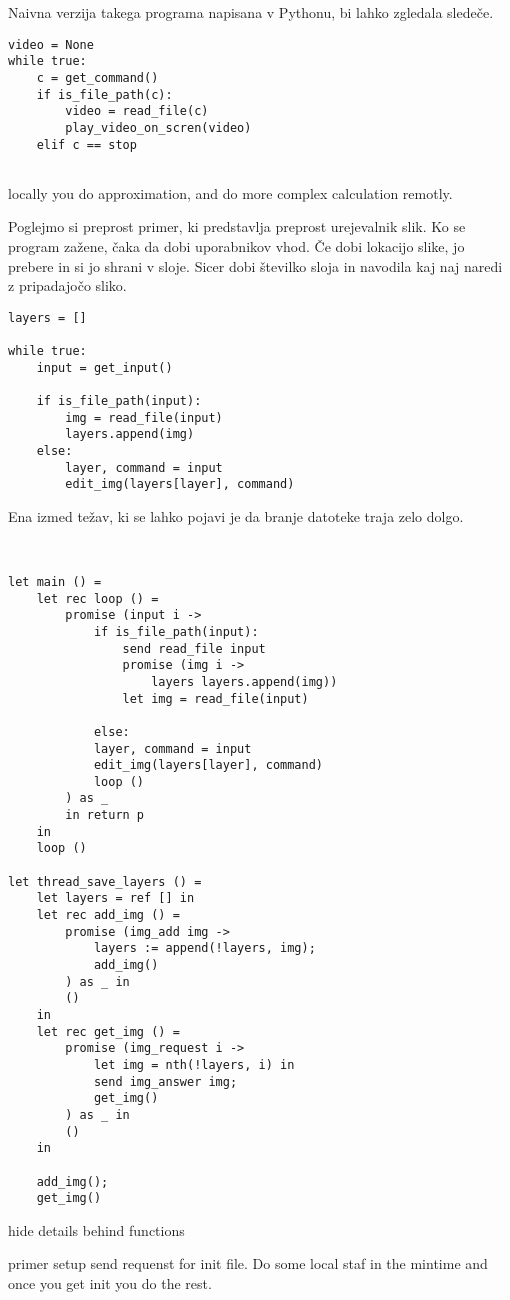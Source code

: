 Naivna verzija takega programa napisana v Pythonu, bi lahko zgledala sledeče.

\begin{lstlisting}[caption={Naiven program.},label={prog:predvajalnik-naiven}]
video = None
while true:
	c = get_command()
	if is_file_path(c):
		video = read_file(c)
		play_video_on_scren(video)
	elif c == stop
		
\end{lstlisting}


locally you do approximation, and do more complex calculation remotly.


Poglejmo si preprost primer, ki predstavlja preprost urejevalnik slik.
Ko se program zažene, čaka da dobi uporabnikov vhod.
Če dobi lokacijo slike, jo prebere in si jo shrani v sloje.
Sicer dobi številko sloja in navodila kaj naj naredi z pripadajočo sliko.

\begin{lstlisting}[caption={Sinhron program.},label={prog:editor-python}]
layers = []

while true:
	input = get_input()
	
	if is_file_path(input):
		img = read_file(input)
		layers.append(img)
	else:
		layer, command = input	
		edit_img(layers[layer], command)
\end{lstlisting}

Ena izmed težav, ki se lahko pojavi je da branje datoteke traja zelo dolgo.



\begin{lstlisting}[caption={Asinhron program.},label={prog:editor-aeff}]


let main () = 
	let rec loop () = 
		promise (input i ->
			if is_file_path(input):
				send read_file input
				promise (img i ->
					layers layers.append(img))
				let img = read_file(input)
				
			else:
			layer, command = input	
			edit_img(layers[layer], command)
			loop ()
		) as _ 
		in return p
	in
	loop ()
	
let thread_save_layers () = 
	let layers = ref [] in
	let rec add_img () =
		promise (img_add img ->
			layers := append(!layers, img);
			add_img()
		) as _ in
		()
	in	
	let rec get_img () =
		promise (img_request i ->
			let img = nth(!layers, i) in
			send img_answer img;
			get_img()
		) as _ in
		()
	in
	
	add_img();
	get_img()

\end{lstlisting}


hide details behind functions

primer setup send requenst for init file. Do some local staf in the mintime and once you get init you do the rest.
